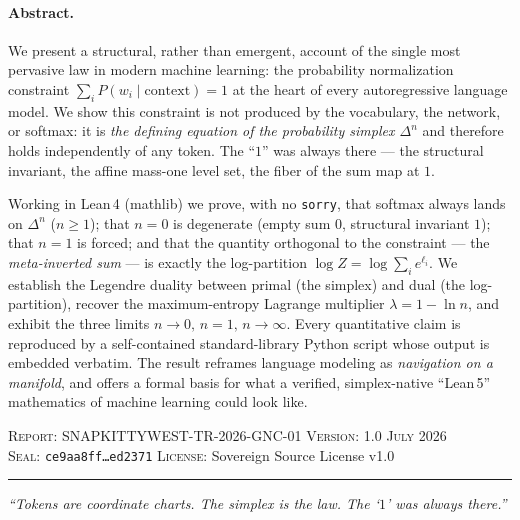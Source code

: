 \documentclass[11pt]{article}
\newcommand{\simplex}[1]{\Delta^{#1}}
\begin{document}
\begin{titlepage}
{{\paragraph{Abstract.}
We present a structural, rather than emergent, account of the single most
pervasive law in modern machine learning: the probability normalization
constraint $\sum_i P(w_i\mid \mathrm{context}) = 1$ at the heart of every
autoregressive language model. We show this constraint is not produced by the
vocabulary, the network, or softmax: it is \emph{the defining equation of the
probability simplex $\simplex{n}$} and therefore holds independently of any
token. The ``$1$'' was always there --- the structural invariant, the affine
mass-one level set, the fiber of the sum map at $1$.

Working in Lean\,4 (mathlib) we prove, with no \texttt{sorry}, that softmax
always lands on $\simplex{n}$ ($n\ge 1$); that $n=0$ is degenerate (empty sum
$0$, structural invariant $1$); that $n=1$ is forced; and that the quantity
orthogonal to the constraint --- the \emph{meta-inverted sum} --- is exactly the
log-partition $\log Z = \log\sum_i e^{\ell_i}$. We establish the Legendre
duality between primal (the simplex) and dual (the log-partition), recover the
maximum-entropy Lagrange multiplier $\lambda = 1 - \ln n$, and exhibit the three
limits $n\to 0,\, n=1,\, n\to\infty$. Every quantitative claim is reproduced by
a self-contained standard-library Python script whose output is embedded
verbatim. The result reframes language modeling as \emph{navigation on a
manifold}, and offers a formal basis for what a verified, simplex-native
``Lean\,5'' mathematics of machine learning could look like.
}}

\vspace{0.8cm}

{\color{leangray}\small\noindent
\textsc{Report}: SNAPKITTYWEST-TR-2026-GNC-01 \quad\textbullet\quad
\textsc{Version}: 1.0 \quad\textbullet\quad \textsc{July 2026}\\[0.1cm]
\textsc{Seal}: \texttt{ce9aa8ff\ldots ed2371} \quad\textbullet\quad
\textsc{License}: Sovereign Source License v1.0
}

\vspace{0.3cm}
{\color{leanblue}\rule{\textwidth}{2pt}}
\vfill
\begin{center}
{\color{leangray}\itshape ``Tokens are coordinate charts. The simplex is the law. The `$1$' was always there.''}
\end{center}
\end{titlepage}
\end{document}
